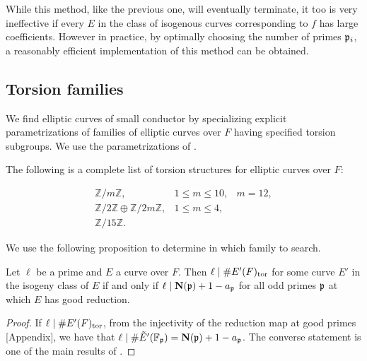 \documentclass{amsart}
\begin{document}
While this method, like the previous one, will eventually terminate, it too is very
ineffective if every $E$ in the class of isogenous curves corresponding to $f$ has
large coefficients. However in practice, by optimally choosing the number of primes $\mathfrak{p}_i$, 
a reasonably efficient implementation of this method can be obtained.



\subsection{Torsion families}\label{sec:torsion}

We find elliptic curves of small conductor by specializing explicit parametrizations
of families of elliptic curves over $F$ having specified torsion subgroups.
We use the parametrizations of \cite{kubert:torfam}.

\begin{theorem} The following is
a complete list of torsion structures for elliptic curves over $F$:

$$\begin{array}{lll}
\mathbb{Z}/m\mathbb{Z},   &1 \leq m \leq 10,& m = 12,\\
\mathbb{Z}/2\mathbb{Z} \oplus \mathbb{Z}/2m\mathbb{Z}, &  1 \leq m \leq 4,&\\
\mathbb{Z}/15\mathbb{Z}.&&
\end{array}$$ \end{theorem}

We use the following proposition to determine in which family to
search.
\begin{proposition}\label{prop:ptor}
Let $\ell$ be a prime and $E$ a curve over $F$.
Then $\ell \mid \# E'(F)_{\operatorname{tor}}$ for some curve $E'$ in the isogeny class
of $E$ if and only if $\ell \mid \mathbf{N}(\mathfrak{p})+1 - a_{\mathfrak{p}}$ for all
odd primes $\mathfrak{p}$ at which $E$ has good reduction.
\end{proposition}
\begin{proof}
If $\ell  \mid \# E'(F)_{\operatorname{tor}}$, from the injectivity of the
reduction map at good primes \cite{katz:torsion}[Appendix], we have that
$\ell \mid \#\tilde E'(\mathbb{F}_{\mathfrak{p}}) = \mathbf{N}(\mathfrak{p})+1 - a_{\mathfrak{p}}$. The converse statement
is one of the main results of \cite{katz:torsion}.
\end{proof}
\end{document}
